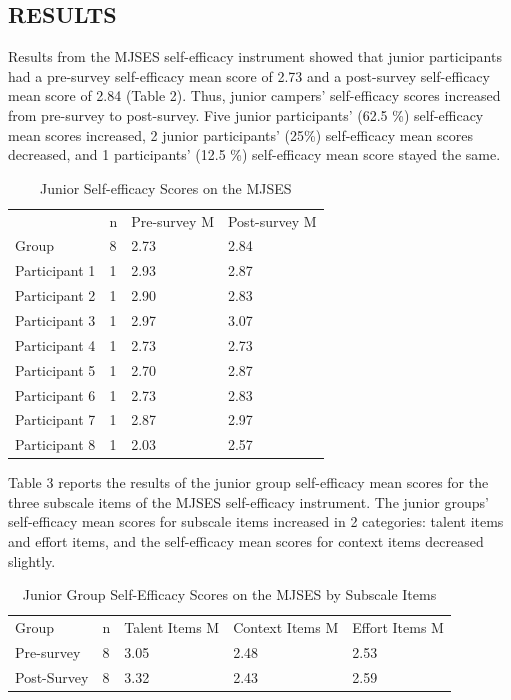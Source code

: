 \documentclass[11.5pt]{sig-alternate} %
\begin{document}
\begin{large}
\section*{RESULTS}
	
Results from the MJSES self-efficacy instrument showed that junior participants had a pre-survey self-efficacy mean score of 2.73 and a post-survey self-efficacy mean score of 2.84 (Table 2). Thus, junior campers’ self-efficacy scores increased from pre-survey to post-survey. Five junior participants’ (62.5 \%) self-efficacy mean scores increased, 2 junior participants’ (25\%) self-efficacy mean scores decreased, and 1 participants’ (12.5 \%) self-efficacy mean score stayed the same.  

\begin{table}[p]
\caption{Junior Self-efficacy Scores on the MJSES}
\begin{tabular}{llll}
\hline
 & n & Pre-survey M & Post-survey M \\
Group & 8 & 2.73 & 2.84 \\
Participant 1 & 1 & 2.93 & 2.87 \\
Participant 2 & 1 & 2.90 & 2.83 \\
Participant 3 & 1 & 2.97 & 3.07 \\
Participant 4 & 1 & 2.73 & 2.73 \\
Participant 5 & 1 & 2.70 & 2.87 \\
Participant 6 & 1 & 2.73 & 2.83 \\
Participant 7 & 1 & 2.87 & 2.97 \\
Participant 8 & 1 & 2.03 & 2.57 \\ \hline
\end{tabular}
\end{table}

Table 3 reports the results of the junior group self-efficacy mean scores for the three subscale items of the MJSES self-efficacy instrument. The junior groups’ self-efficacy mean scores for subscale items increased in 2 categories: talent items and effort items, and the self-efficacy mean scores for context items decreased slightly. 

\begin{table}[p]
\caption{Junior Group Self-Efficacy Scores on the MJSES by Subscale Items}
\begin{tabular}{lllll}
\hline
Group & n & Talent Items M & Context Items M & Effort Items M \\
Pre-survey & 8 & 3.05 & 2.48 & 2.53 \\
Post-Survey & 8 & 3.32 & 2.43 & 2.59 \\ \hline
\end{tabular}
\end{table}


\end{large}
\end{document}

